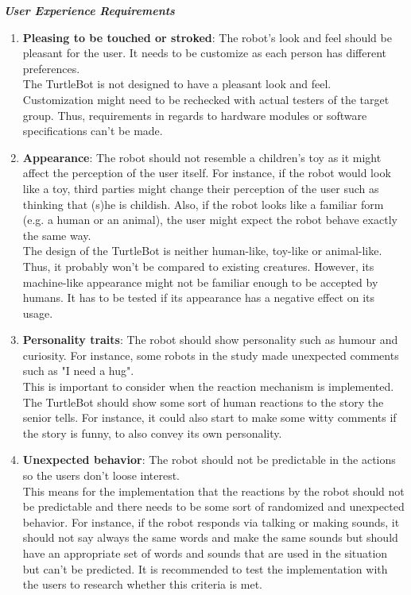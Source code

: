 \documentclass[plainarticle,zihtitle,english,final,hyperref,utf8]{zihpub}
\begin{document}
\textbf{\textit{User Experience Requirements}}
\begin{enumerate}
    \item \textbf{Pleasing to be touched or stroked}: The robot's look and feel should be pleasant for the user. It needs to be customize as each person has different preferences. \\
    \newline
    The TurtleBot is not designed to have a pleasant look and feel. Customization might need to be rechecked with actual testers of the target group. Thus, requirements in regards to hardware modules or software specifications can't be made.
    \item \textbf{Appearance}: The robot should not resemble a children's toy as it might affect the perception of the user itself. For instance, if the robot would look like a toy, third parties might change their perception of the user such as thinking that (s)he is childish. Also, if the robot looks like a familiar form (e.g. a human or an animal), the user might expect the robot behave exactly the same way.\\
    \newline
    The design of the TurtleBot is neither human-like, toy-like or animal-like. Thus, it probably won't be compared to existing creatures. However, its machine-like appearance might not be familiar enough to be accepted by humans. It has to be tested if its appearance has a negative effect on its usage.
    \item \textbf{Personality traits}: The robot should show personality such as humour and curiosity. For instance, some robots in the study made unexpected comments such as "I need a hug".\\
    \newline
    This is important to consider when the reaction mechanism is implemented. The TurtleBot should show some sort of human reactions to the story the senior tells. For instance, it could also start to make some witty comments if the story is funny, to also convey its own personality.
    \item \textbf{Unexpected behavior}: The robot should not be predictable in the actions so the users don't loose interest.\\
    \newline
    This means for the implementation that the reactions by the robot should not be predictable and there needs to be some sort of randomized and unexpected behavior. For instance, if the robot responds via talking or making sounds, it should not say always the same words and make the same sounds but should have an appropriate set of words and sounds that are used in the situation but can't be predicted. It is recommended to test the implementation with the users to research whether this criteria is met.

\end{enumerate}
\end{document}
